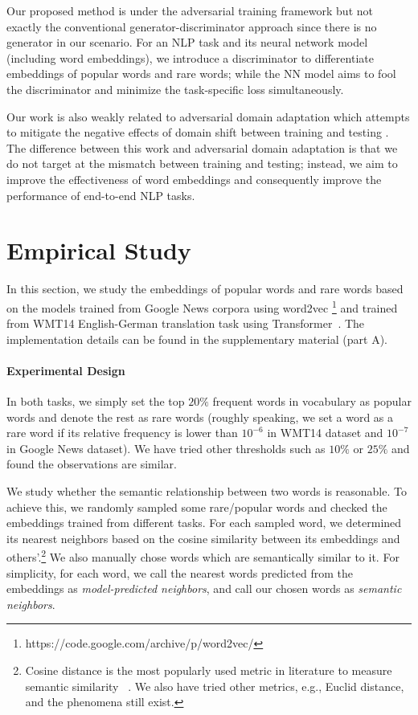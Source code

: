 \documentclass{article}
\begin{document}
Our proposed method is under the adversarial training framework but not exactly the conventional generator-discriminator approach since there is no generator in our scenario. For an NLP task and its neural network model (including word embeddings), we introduce a discriminator to differentiate embeddings of popular words and rare words; while the NN model aims to fool the discriminator and minimize the task-specific loss simultaneously.

Our work is also weakly related to adversarial domain adaptation which attempts to mitigate the negative effects of domain shift between training and testing \cite{ganin2015unsupervised,DBLP:conf/cvpr/TzengHSD17}. The difference between this work and adversarial domain adaptation is that we do not target at the mismatch between training and testing; instead, we aim to improve the effectiveness of word embeddings and consequently improve the performance of end-to-end NLP tasks.


\section{Empirical Study}
\label{Empirical-Study}
In this section, we study the embeddings of popular words and rare words based on the models trained from Google News corpora using word2vec \footnote{https://code.google.com/archive/p/word2vec/} and trained from WMT14 English-German translation task using Transformer~\cite{vaswani2017attention}. The implementation details can be found in the supplementary material (part A).

\paragraph{Experimental Design} In both tasks, we simply set the top $20\%$ frequent words in vocabulary as popular words and denote the rest as rare words (roughly speaking, we set a word as a rare word if its relative frequency is lower than $10^{-6}$ in WMT14 dataset and $10^{-7}$ in Google News dataset). We have tried other thresholds such as $10\%$ or $25\%$ and found the observations are similar.

We study whether the semantic relationship between two words is reasonable. To achieve this, we randomly sampled some rare/popular words and checked the embeddings trained from different tasks. For each sampled word, we determined its nearest neighbors based on the cosine similarity between its embeddings and others'.\footnote{Cosine distance is the most popularly used metric in literature to measure semantic similarity ~\cite{mikolov2013distributed, DBLP:conf/emnlp/PenningtonSM14, mu2017all}. We also have tried other metrics, e.g., Euclid distance, and the phenomena still exist.} We also manually chose words which are semantically similar to it. For simplicity, for each word, we call the nearest words predicted from the embeddings as \emph{model-predicted neighbors}, and call our chosen words as \emph{semantic neighbors}.
\end{document}
